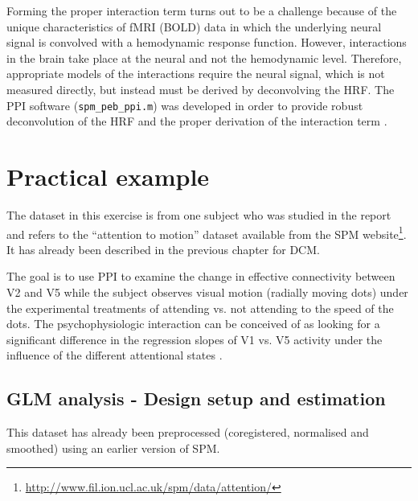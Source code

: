 Forming the proper interaction term turns out to be a challenge because of the unique characteristics of fMRI (BOLD) data in which the underlying neural signal is convolved with a hemodynamic response function. However, interactions in the brain take place at the neural and not the hemodynamic level. Therefore, appropriate models of the interactions require the neural signal, which is not measured directly, but instead must be derived by deconvolving the HRF. The PPI software (\texttt{spm\_peb\_ppi.m}) was developed in order to provide robust deconvolution of the HRF and the proper derivation of the interaction term \cite{gitelman_03}.

\section{Practical example}

The dataset in this exercise is from one subject who was studied in the \cite{buchel1998} report and refers to the ``attention to motion'' dataset available from the SPM website\footnote{\url{http://www.fil.ion.ucl.ac.uk/spm/data/attention/}}. It has already been described in the previous chapter for DCM.

The goal is to use PPI to examine the change in effective connectivity between V2 and V5 while the subject observes visual motion (radially moving dots) under the experimental treatments of attending vs. not attending to the speed of the dots. The psychophysiologic interaction can be conceived of as looking for a significant difference in the regression slopes of V1 vs. V5 activity under the influence of the different attentional states \cite{ppi}.

\subsection{GLM analysis - Design setup and estimation}

This dataset has already been preprocessed (coregistered, normalised and smoothed) using an earlier version of SPM.

